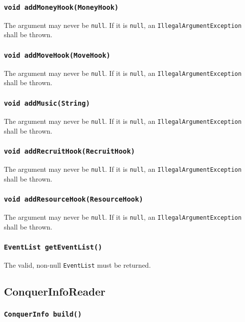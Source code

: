 \documentclass{article}
\begin{document}
\subsubsection{\texttt{void addMoneyHook(MoneyHook)}}
The argument may never be \texttt{null}. If it is \texttt{null}, an \texttt{IllegalArgumentException}
shall be thrown.

\subsubsection{\texttt{void addMoveHook(MoveHook)}}
The argument may never be \texttt{null}. If it is \texttt{null}, an \texttt{IllegalArgumentException}
shall be thrown.

\subsubsection{\texttt{void addMusic(String)}}
The argument may never be \texttt{null}. If it is \texttt{null}, an \texttt{IllegalArgumentException}
shall be thrown.

\subsubsection{\texttt{void addRecruitHook(RecruitHook)}}
The argument may never be \texttt{null}. If it is \texttt{null}, an \texttt{IllegalArgumentException}
shall be thrown.

\subsubsection{\texttt{void addResourceHook(ResourceHook)}}
The argument may never be \texttt{null}. If it is \texttt{null}, an \texttt{IllegalArgumentException}
shall be thrown.

\subsubsection{\texttt{EventList getEventList()}}
The valid, non-null \texttt{EventList} must be returned.

\subsection{ConquerInfoReader}

\subsubsection{\texttt{ConquerInfo build()}}
\end{document}
